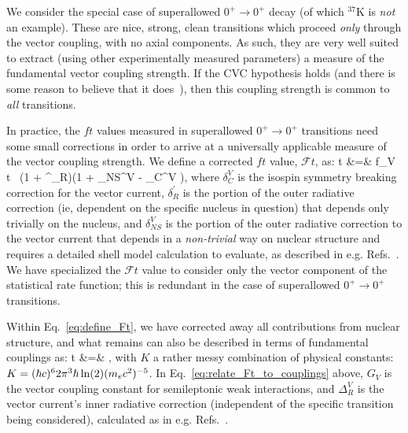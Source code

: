 We consider the special case of superallowed $0^+ \rightarrow 0^+$ decay (of which $^{37}$K is \emph{not} an example).  These are nice, strong, clean transitions which proceed \emph{only} through the vector coupling, with no axial components.  As such, they are very well suited to extract (using other experimentally measured parameters) a measure of the fundamental vector coupling strength.  If the \ac{CVC} hypothesis holds (and there is some reason to believe that it does~\cite{severijns2006}\cite{HardyTownerSuperallowed2020}), then this coupling strength is common to \emph{all} transitions.


In practice, the $ft$ values measured in superallowed $0^+ \rightarrow 0^+$ transitions need some small corrections in order to arrive at a universally applicable measure of the vector coupling strength.  We define a corrected $ft$ value, $\mathcal{F}t$, as:
\bea
{}t &=& f_V t \, (1 + \delta^\prime_R)(1 + \delta_{NS}^V - \delta_C^{V} ),
\label{eq:define_Ft}
\eea
where 
$\delta_C^{V}$ is the isospin symmetry breaking correction for the vector current, 
$\delta^\prime_R$ is the portion of the outer radiative correction (ie, dependent on the specific nucleus in question) that depends only trivially on the nucleus, 
and
$\delta_{NS}^{V}$ is the portion of the outer radiative correction %
to the vector current that depends in a \emph{non-trivial} way on nuclear structure and requires a detailed shell model calculation to evaluate, as described in e.g.  Refs.~\cite{TownerHardy2008}\cite{JausRasche1990}\cite{barker1992}\cite{Towner1992}\cite{Towner1994}.  We have specialized the $\mathcal{F}t$ value to consider only the vector component of the statistical rate function; this is redundant in the case of superallowed $0^+ \rightarrow 0^+$ transitions.

Within Eq.~\ref{eq:define_Ft}, we have corrected away all contributions from nuclear structure, and what remains can also be described in terms of fundamental couplings as:
\bea
{}t &=& ,
\label{eq:relate_Ft_to_couplings}
\eea
with $K$ a rather messy combination of physical constants: $K = (\hbar c)^6 2\pi^3 \hbar \ln(2) (m_e c^2)^{-5}$.  In Eq.~\ref{eq:relate_Ft_to_couplings} above, $G_V$ is the vector coupling constant for semileptonic weak interactions, and $\Delta_R^{V}$ is the vector current's inner radiative correction (independent of the specific transition being considered), calculated as in e.g. Refs.~\cite{MarcianoSirlin_1986}\cite{MarcianoSirlin_2006}\cite{CzarneckiMarcianoSirlin_2019}.  %

